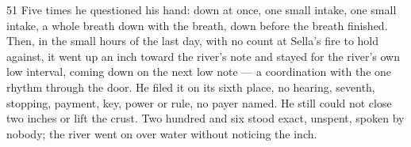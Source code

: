 \begin{CRchronicle}{51}
Five times he questioned his hand: down at once, one small intake, one small intake, a whole breath down with the breath, down before the breath finished. Then, in the small hours of the last day, with no count at Sella’s fire to hold against, it went up an inch toward the river’s note and stayed for the river’s own low interval, coming down on the next low note --- a coordination with the one rhythm through the door. He filed it on its sixth place, no hearing, seventh, stopping, payment, key, power or rule, no payer named. He still could not close two inches or lift the crust. Two hundred and six stood exact, unspent, spoken by nobody; the river went on over water without noticing the inch.
\end{CRchronicle}
